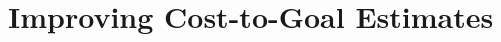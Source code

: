 \documentclass[ppgc,diss,english]{iiufrgs}
\providecommand{\ceil}[1]{\ensuremath{\left\lceil #1\right\rceil}}
\newtheorem{property}{Property}
\begin{document}
%

\section{Improving Cost-to-Goal Estimates}
\label{sec:sample-improving-h}


\end{document}
